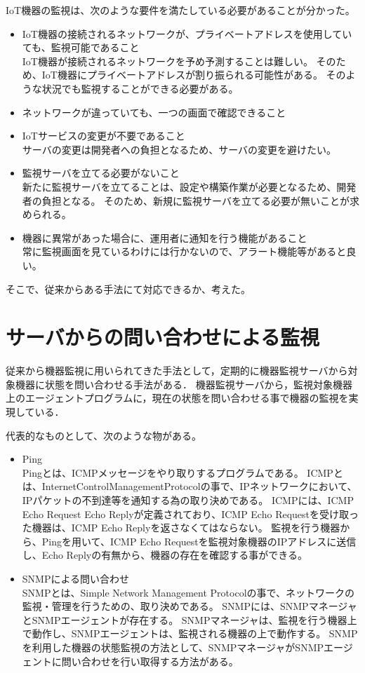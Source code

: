 IoT機器の監視は、次のような要件を満たしている必要があることが分かった。
\begin{itemize}
\item IoT機器の接続されるネットワークが、プライベートアドレスを使用していても、監視可能であること\\
	IoT機器が接続されるネットワークを予め予測することは難しい。
	そのため、IoT機器にプライベートアドレスが割り振られる可能性がある。
	そのような状況でも監視することができる必要がある。
\item ネットワークが違っていても、一つの画面で確認できること\\
\item IoTサービスの変更が不要であること\\
	サーバの変更は開発者への負担となるため、サーバの変更を避けたい。
\item 監視サーバを立てる必要がないこと\\
	新たに監視サーバを立てることは、設定や構築作業が必要となるため、開発者の負担となる。
	そのため、新規に監視サーバを立てる必要が無いことが求められる。
\item 機器に異常があった場合に、運用者に通知を行う機能があること\\
	常に監視画面を見ているわけには行かないので、アラート機能等があると良い。
\end{itemize}

そこで、従来からある手法にて対応できるか、考えた。
\section{サーバからの問い合わせによる監視}
	従来から機器監視に用いられてきた手法として，定期的に機器監視サーバから対象機器に状態を問い合わせる手法がある．
	機器監視サーバから，監視対象機器上のエージェントプログラムに，現在の状態を問い合わせる事で機器の監視を実現している．
	\medskip

	代表的なものとして、次のような物がある。
	\begin{itemize}
		\item Ping\\
			Pingとは、ICMPメッセージをやり取りするプログラムである。
			ICMPとは、InternetControlManagementProtocolの事で、IPネットワークにおいて、IPパケットの不到達等を通知する為の取り決めである。
			ICMPには、ICMP Echo Request Echo Replyが定義されており、ICMP Echo Requestを受け取った機器は、ICMP Echo Replyを返さなくてはならない。
			監視を行う機器から、Pingを用いて、ICMP Echo Requestを監視対象機器のIPアドレスに送信し、Echo Replyの有無から、機器の存在を確認する事ができる。
		\item SNMPによる問い合わせ\\
			SNMPとは、Simple Network Management Protocolの事で、ネットワークの監視・管理を行うための、取り決めである。
			SNMPには、SNMPマネージャとSNMPエージェントが存在する。
			SNMPマネージャは、監視を行う機器上で動作し、SNMPエージェントは、監視される機器の上で動作する。
			SNMPを利用した機器の状態監視の方法として、SNMPマネージャがSNMPエージェントに問い合わせを行い取得する方法がある。
	\end{itemize}
	
